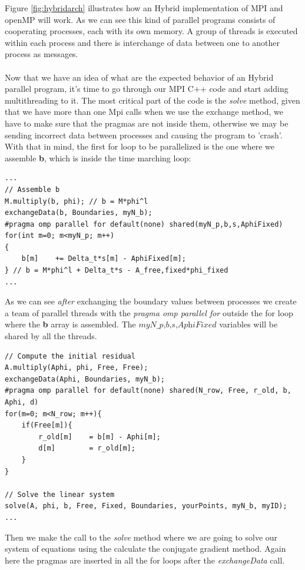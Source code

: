 \documentclass[12pt]{article}
\begin{document}
Figure \ref{fig:hybridarch} illustrates how an Hybrid implementation of MPI and openMP will work. As we can see this kind of parallel programs consists of cooperating processes, each with its own memory. A group of threads is executed within each process and there is interchange of data between one to another process as messages. 
\\\\
Now that we have an idea of what are the expected behavior of an Hybrid parallel program, it's time to go through our MPI C++ code and start adding multithreading to it. The most critical part of the code is the \textit{solve} method, given that we have more than one Mpi calls when we use the exchange method, we have to make sure that the pragmas are not inside them, otherwise we may be sending incorrect data between processes and causing the program to 'crash'. With that in mind, the first for loop to be parallelized is the one where we assemble \textbf{b}, which is inside the time marching loop:

\begin{lstlisting}[style=MyC++Style]
...
// Assemble b
M.multiply(b, phi); // b = M*phi^l
exchangeData(b, Boundaries, myN_b);
#pragma omp parallel for default(none) shared(myN_p,b,s,AphiFixed)
for(int m=0; m<myN_p; m++)
{
	b[m]	+= Delta_t*s[m] - AphiFixed[m];
} // b = M*phi^l + Delta_t*s - A_free,fixed*phi_fixed
...
\end{lstlisting}

As we can see \textit{after} exchanging the boundary values between processes we create a team of parallel threads with the \textit{pragma omp parallel for} outside the for loop where the \textbf{b} array is assembled. The $\textit{myN\_p,b,s,AphiFixed}$ variables will be shared by all the threads.

\begin{lstlisting}[style=MyC++Style]
// Compute the initial residual
A.multiply(Aphi, phi, Free, Free);
exchangeData(Aphi, Boundaries, myN_b); 
#pragma omp parallel for default(none) shared(N_row, Free, r_old, b, Aphi, d)
for(m=0; m<N_row; m++){
	if(Free[m]){
		r_old[m]	= b[m] - Aphi[m];
		d[m]		= r_old[m];
	}
}

// Solve the linear system
solve(A, phi, b, Free, Fixed, Boundaries, yourPoints, myN_b, myID);
...
\end{lstlisting}

Then we make the call to the \textit{solve} method where we are going to solve our system of equations using the calculate the conjugate gradient method. Again here the pragmas are inserted in all the for loops after the \textit{exchangeData} call.
 
\end{document}
